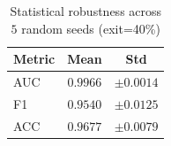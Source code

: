 \begin{table}[h]
\centering
\caption{Statistical robustness across $5$ random seeds (exit=40\%)}
\label{tab:multi_seed}
\begin{tabular}{lcc}
\toprule
Metric & Mean & Std \\
\midrule
AUC & $0.9966$ & $\pm0.0014$ \\
F1 & $0.9540$ & $\pm0.0125$ \\
ACC & $0.9677$ & $\pm0.0079$ \\
\bottomrule
\end{tabular}
\end{table}